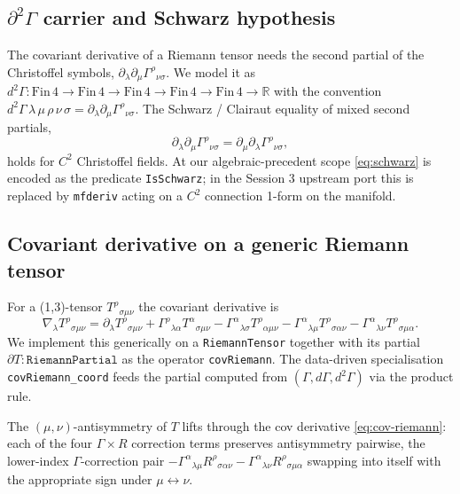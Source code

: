 \documentclass[twocolumn]{revtex4-2}
\newcommand{\Christoffel}{\Gamma}
\begin{document}
\subsection{$\partial^{2}\Christoffel$ carrier and Schwarz hypothesis}
\label{sec:d2gamma}
The covariant derivative of a Riemann tensor needs the second partial
of the Christoffel symbols, $\partial_{\lambda} \partial_{\mu}
\Christoffel^{\rho}{}_{\nu\sigma}$. We model it as $d^{2}\Christoffel :
\mathrm{Fin}\,4 \to \mathrm{Fin}\,4 \to \mathrm{Fin}\,4 \to
\mathrm{Fin}\,4 \to \mathrm{Fin}\,4 \to \mathbb{R}$ with the convention
$d^{2}\Christoffel\,\lambda\,\mu\,\rho\,\nu\,\sigma = \partial_{\lambda}
\partial_{\mu} \Christoffel^{\rho}{}_{\nu\sigma}$. The Schwarz / Clairaut
equality of mixed second partials,
\begin{equation}
\partial_{\lambda} \partial_{\mu} \Christoffel^{\rho}{}_{\nu\sigma}
  = \partial_{\mu} \partial_{\lambda} \Christoffel^{\rho}{}_{\nu\sigma},
\label{eq:schwarz}
\end{equation}
holds for $C^{2}$ Christoffel fields. At our algebraic-precedent scope
\eqref{eq:schwarz} is encoded as the predicate \texttt{IsSchwarz}; in
the Session 3 upstream port this is replaced by \texttt{mfderiv}
acting on a $C^{2}$ connection 1-form on the manifold.

\subsection{Covariant derivative on a generic Riemann tensor}
\label{sec:cov-riem}
For a (1,3)-tensor $T^{\rho}{}_{\sigma\mu\nu}$ the covariant derivative is
\begin{equation}
\nabla_{\lambda} T^{\rho}{}_{\sigma\mu\nu}
  = \partial_{\lambda} T^{\rho}{}_{\sigma\mu\nu}
  + \Christoffel^{\rho}{}_{\lambda\alpha} T^{\alpha}{}_{\sigma\mu\nu}
  - \Christoffel^{\alpha}{}_{\lambda\sigma} T^{\rho}{}_{\alpha\mu\nu}
  - \Christoffel^{\alpha}{}_{\lambda\mu} T^{\rho}{}_{\sigma\alpha\nu}
  - \Christoffel^{\alpha}{}_{\lambda\nu} T^{\rho}{}_{\sigma\mu\alpha}.
\label{eq:cov-riemann}
\end{equation}
We implement this generically on a \texttt{RiemannTensor} together with
its partial $\partial T : \texttt{RiemannPartial}$ as the operator
\texttt{covRiemann}. The data-driven specialisation
\texttt{covRiemann\_coord} feeds the partial computed from
$(\Christoffel, d\Christoffel, d^{2}\Christoffel)$ via the product rule.

The $(\mu,\nu)$-antisymmetry of $T$ lifts through the cov derivative
\eqref{eq:cov-riemann}: each of the four
$\Christoffel \times R$ correction terms preserves antisymmetry
pairwise, the lower-index $\Christoffel$-correction pair
$-\Christoffel^{\alpha}{}_{\lambda\mu} R^{\rho}{}_{\sigma\alpha\nu}
- \Christoffel^{\alpha}{}_{\lambda\nu} R^{\rho}{}_{\sigma\mu\alpha}$
swapping into itself with the appropriate sign under
$\mu \leftrightarrow \nu$.
\end{document}
